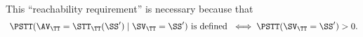 \begin{note}
  This ``reachability requirement'' is necessary
  because 
  that
  $$\text{ 
  $
  \PSTT(\AV_\TT = \STT_\TT(\SS') \mid \SV_\TT = \SS')$
  is defined } 
  \iff 
  \PSTT(\SV_{\TT} = \SS') > 0
  .$$%
\end{note}
